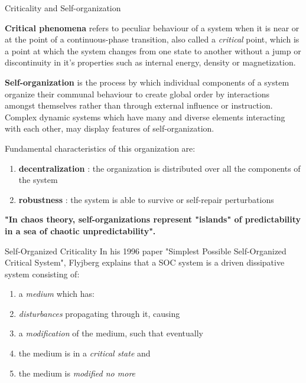 {
\begin{frame}{Criticality and Self-organization}

{\bf Critical phenomena} refers to peculiar behaviour of a system when it is near or at the point of a continuous-phase transition, also called a {\it critical} point, which is a point at which the system changes from one state to another without a jump or discontinuity in it's properties such as internal energy, density or magnetization.

\vspace{5mm}

{\bf Self-organization} is the process by which individual components of a system organize their communal behaviour to create global order by interactions amongst themselves rather than through external influence or instruction. Complex dynamic systems which have many and diverse elements interacting with each other, may display features of self-organization. \par
Fundamental characteristics of this organization are:
\begin{enumerate}
	\item {\bf decentralization} : the organization is distributed over all the components of the system
	\item {\bf robustness} : the system is able to survive or self-repair perturbations
\end{enumerate}
{\bf "In chaos theory, self-organizations represent "islands" of predictability in a sea of chaotic unpredictability".}

\end{frame}
}


{
\begin{frame}{Self-Organized Criticality}
In his 1996 paper "Simplest Possible Self-Organized Critical System", Flyjberg explains that a SOC system is a driven dissipative system consisting of:
\begin{enumerate}
	\item a {\it medium} which has:
	\item {\it disturbances} propagating through it, causing
	\item a {\it modification} of the medium, such that eventually
	\item the medium is in a {\it critical state} and
	\item the medium is {\it modified no more}
\end{enumerate}
\end{frame}
}


